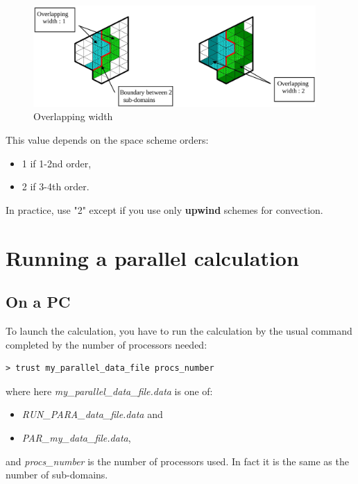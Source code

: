 \begin{figure}[h!]
\begin{center}
\includegraphics[width=0.96\textwidth]{overlap.jpeg}
\caption{Overlapping width}
\label{overlap}
\end{center}
\end{figure}

This value depends on the space scheme orders:
\begin{itemize}
\item 1 if 1-2nd order,
\item 2 if 3-4th order.
\end{itemize}
In practice, use "2" except if you use only \textbf{upwind} schemes for convection.



\section{Running a parallel calculation}

\subsection{On a PC}
To launch the calculation, you have to run the calculation by the usual command completed by the number of processors needed:
\begin{verbatim}
> trust my_parallel_data_file procs_number
\end{verbatim}

where here \textit{my\_parallel\_data\_file.data} is one of:
\begin{itemize}
\item \textit{RUN\_PARA\_data\_file.data} and
\item \textit{PAR\_my\_data\_file.data},
\end{itemize}
and \textit{procs\_number} is the number of processors used. In fact it is the same as the number of sub-domains.\\

